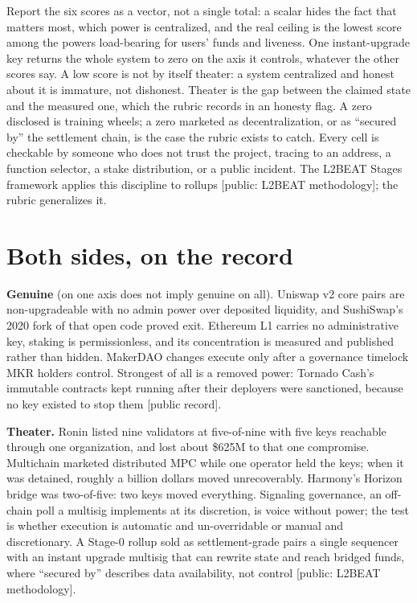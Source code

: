 \documentclass[11pt,a4paper]{article}
\newcommand{\pv}[1]{{\color{muted}\sffamily\scriptsize[#1]}}
\begin{document}
Report the six scores as a vector, not a single total: a scalar hides the fact that
matters most, which power is centralized, and the real ceiling is the lowest score
among the powers load-bearing for users' funds and liveness. One instant-upgrade key
returns the whole system to zero on the axis it controls, whatever the other scores
say. A low score is not by itself theater: a system centralized and honest about it
is immature, not dishonest. Theater is the gap between the claimed state and the
measured one, which the rubric records in an honesty flag. A zero disclosed is
training wheels; a zero marketed as decentralization, or as ``secured by'' the
settlement chain, is the case the rubric exists to catch. Every cell is checkable by
someone who does not trust the project, tracing to an address, a function selector, a
stake distribution, or a public incident. The L2BEAT Stages framework applies this
discipline to rollups \pv{public: L2BEAT methodology}; the rubric generalizes it.

\section{Both sides, on the record}

\noindent\textbf{Genuine} (on one axis does not imply genuine on all). Uniswap v2
core pairs are non-upgradeable with no admin power over deposited liquidity, and
SushiSwap's 2020 fork of that open code proved exit. Ethereum L1 carries no
administrative key, staking is permissionless, and its concentration is measured and
published rather than hidden. MakerDAO changes execute only after a governance
timelock MKR holders control. Strongest of all is a removed power: Tornado Cash's
immutable contracts kept running after their deployers were sanctioned, because no
key existed to stop them \pv{public record}.

\noindent\textbf{Theater.} Ronin listed nine validators at five-of-nine with five
keys reachable through one organization, and lost about \$625M to that one
compromise. Multichain marketed distributed MPC while one operator held the keys;
when it was detained, roughly a billion dollars moved unrecoverably. Harmony's
Horizon bridge was two-of-five: two keys moved everything. Signaling governance, an
off-chain poll a multisig implements at its discretion, is voice without power; the
test is whether execution is automatic and un-overridable or manual and
discretionary. A Stage-0 rollup sold as settlement-grade pairs a single sequencer
with an instant upgrade multisig that can rewrite state and reach bridged funds,
where ``secured by'' describes data availability, not control
\pv{public: L2BEAT methodology}.
\end{document}
